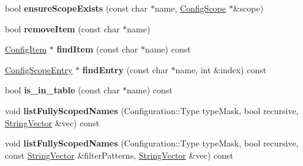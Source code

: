 \begin{DoxyCompactItemize}
\item 
\hypertarget{classCONFIG4CPP__NAMESPACE_1_1ConfigScope_a5b8dd11c8741bac3996d9b9b63345520}{bool {\bfseries ensure\-Scope\-Exists} (const char $\ast$name, \hyperlink{classCONFIG4CPP__NAMESPACE_1_1ConfigScope}{Config\-Scope} $\ast$\&scope)}\label{classCONFIG4CPP__NAMESPACE_1_1ConfigScope_a5b8dd11c8741bac3996d9b9b63345520}

\item 
\hypertarget{classCONFIG4CPP__NAMESPACE_1_1ConfigScope_a5a4cf3057c9a8295fdc88d07374eb1e1}{bool {\bfseries remove\-Item} (const char $\ast$name)}\label{classCONFIG4CPP__NAMESPACE_1_1ConfigScope_a5a4cf3057c9a8295fdc88d07374eb1e1}

\item 
\hypertarget{classCONFIG4CPP__NAMESPACE_1_1ConfigScope_a2dc87e96a4a54182f9fd87b513a0dc7f}{\hyperlink{classCONFIG4CPP__NAMESPACE_1_1ConfigItem}{Config\-Item} $\ast$ {\bfseries find\-Item} (const char $\ast$name) const }\label{classCONFIG4CPP__NAMESPACE_1_1ConfigScope_a2dc87e96a4a54182f9fd87b513a0dc7f}

\item 
\hypertarget{classCONFIG4CPP__NAMESPACE_1_1ConfigScope_aef6770e9e55b3ef7e6e086b8c5d33efe}{\hyperlink{classCONFIG4CPP__NAMESPACE_1_1ConfigScopeEntry}{Config\-Scope\-Entry} $\ast$ {\bfseries find\-Entry} (const char $\ast$name, int \&index) const }\label{classCONFIG4CPP__NAMESPACE_1_1ConfigScope_aef6770e9e55b3ef7e6e086b8c5d33efe}

\item 
\hypertarget{classCONFIG4CPP__NAMESPACE_1_1ConfigScope_a1e5997b463c8c7d90e41b0d333779dfb}{bool {\bfseries is\-\_\-in\-\_\-table} (const char $\ast$name) const }\label{classCONFIG4CPP__NAMESPACE_1_1ConfigScope_a1e5997b463c8c7d90e41b0d333779dfb}

\item 
\hypertarget{classCONFIG4CPP__NAMESPACE_1_1ConfigScope_afa44121e162e8fe8b8c60557a4efdddf}{void {\bfseries list\-Fully\-Scoped\-Names} (Configuration\-::\-Type type\-Mask, bool recursive, \hyperlink{classCONFIG4CPP__NAMESPACE_1_1StringVector}{String\-Vector} \&vec) const }\label{classCONFIG4CPP__NAMESPACE_1_1ConfigScope_afa44121e162e8fe8b8c60557a4efdddf}

\item 
\hypertarget{classCONFIG4CPP__NAMESPACE_1_1ConfigScope_a51bc6cabe45220aedbc64a14f8c3ed42}{void {\bfseries list\-Fully\-Scoped\-Names} (Configuration\-::\-Type type\-Mask, bool recursive, const \hyperlink{classCONFIG4CPP__NAMESPACE_1_1StringVector}{String\-Vector} \&filter\-Patterns, \hyperlink{classCONFIG4CPP__NAMESPACE_1_1StringVector}{String\-Vector} \&vec) const }\label{classCONFIG4CPP__NAMESPACE_1_1ConfigScope_a51bc6cabe45220aedbc64a14f8c3ed42}


\end{DoxyCompactItemize}
